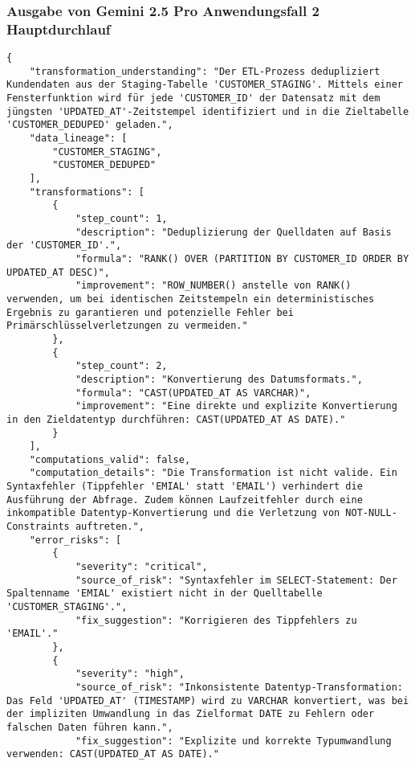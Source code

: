 \subsubsection{Ausgabe von Gemini 2.5 Pro Anwendungsfall 2 Hauptdurchlauf}\label{anhang:subsubsec:gemini_case2_prompt1}
\begin{lstlisting}[caption={Ausgabe: Gemini 2.5 Pro Anwendungsfall 2 Hauptdurchlauf},label={gemini_case2_prompt1}]
{
    "transformation_understanding": "Der ETL-Prozess dedupliziert Kundendaten aus der Staging-Tabelle 'CUSTOMER_STAGING'. Mittels einer Fensterfunktion wird für jede 'CUSTOMER_ID' der Datensatz mit dem jüngsten 'UPDATED_AT'-Zeitstempel identifiziert und in die Zieltabelle 'CUSTOMER_DEDUPED' geladen.",
    "data_lineage": [
        "CUSTOMER_STAGING",
        "CUSTOMER_DEDUPED"
    ],
    "transformations": [
        {
            "step_count": 1,
            "description": "Deduplizierung der Quelldaten auf Basis der 'CUSTOMER_ID'.",
            "formula": "RANK() OVER (PARTITION BY CUSTOMER_ID ORDER BY UPDATED_AT DESC)",
            "improvement": "ROW_NUMBER() anstelle von RANK() verwenden, um bei identischen Zeitstempeln ein deterministisches Ergebnis zu garantieren und potenzielle Fehler bei Primärschlüsselverletzungen zu vermeiden."
        },
        {
            "step_count": 2,
            "description": "Konvertierung des Datumsformats.",
            "formula": "CAST(UPDATED_AT AS VARCHAR)",
            "improvement": "Eine direkte und explizite Konvertierung in den Zieldatentyp durchführen: CAST(UPDATED_AT AS DATE)."
        }
    ],
    "computations_valid": false,
    "computation_details": "Die Transformation ist nicht valide. Ein Syntaxfehler (Tippfehler 'EMIAL' statt 'EMAIL') verhindert die Ausführung der Abfrage. Zudem können Laufzeitfehler durch eine inkompatible Datentyp-Konvertierung und die Verletzung von NOT-NULL-Constraints auftreten.",
    "error_risks": [
        {
            "severity": "critical",
            "source_of_risk": "Syntaxfehler im SELECT-Statement: Der Spaltenname 'EMIAL' existiert nicht in der Quelltabelle 'CUSTOMER_STAGING'.",
            "fix_suggestion": "Korrigieren des Tippfehlers zu 'EMAIL'."
        },
        {
            "severity": "high",
            "source_of_risk": "Inkonsistente Datentyp-Transformation: Das Feld 'UPDATED_AT' (TIMESTAMP) wird zu VARCHAR konvertiert, was bei der impliziten Umwandlung in das Zielformat DATE zu Fehlern oder falschen Daten führen kann.",
            "fix_suggestion": "Explizite und korrekte Typumwandlung verwenden: CAST(UPDATED_AT AS DATE)."

\end{lstlisting}
